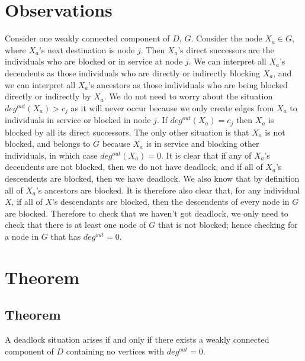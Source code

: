 \documentclass{article}
\begin{document}
\section{Observations}
Consider one weakly connected component of $D$, $G$. Consider the node $X_a \in G$, where $X_a$'s next destination is node $j$. Then $X_a$'s direct successors are the individuals who are blocked or in service at node $j$. We can interpret all $X_a$'s decendents as those individuals who are directly or indirectly blocking $X_a$, and we can interpret all $X_a$'s ancestors as those individuals who are being blocked directly or indirectly by $X_a$.\newline
We do not need to worry about the situation $deg^{out}(X_a) > c_j$ as it will never occur because we only create edges from $X_a$ to individuals in service or blocked in node $j$. If $deg^{out}(X_a) = c_j$ then $X_a$ is blocked by all its direct successors. The only other situation is that $X_a$ is not blocked, and belongs to $G$ because $X_a$ is in service and blocking other individuals, in which case $deg^{out}(X_a) = 0$.\newline
It is clear that if any of $X_a$'s decendents are not blocked, then we do not have deadlock, and if all of $X_a$'s descendents are blocked, then we have deadlock. We also know that by definition all of $X_a$'s ancestors are blocked. It is therefore also clear that, for any individual $X$, if all of $X$'s descendants are blocked, then the descendents of every node in $G$ are blocked. Therefore to check that we haven't got deadlock, we only need to check that there is at least one node of $G$ that is not blocked; hence checking for a node in $G$ that has $deg^{out} = 0$.\newline

\section{Theorem}

\subsection*{Theorem}
A deadlock situation arises if and only if there exists a weakly connected component of $D$ containing no vertices with $deg^{out} = 0$.\newline
\end{document}

